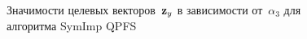 \begin{figure}[ht]
	\begin{minipage}{.5\linewidth}
	\end{minipage}%
	\begin{minipage}{.5\linewidth}
	\end{minipage}\par\medskip
	
	\caption{Значимости целевых векторов~$\mathbf{z}_y$ в зависимости от~$\alpha_3$ для алгоритма SymImp QPFS}
	\label{ch2:fig:features_vs_alpha_ecog}
\end{figure}


